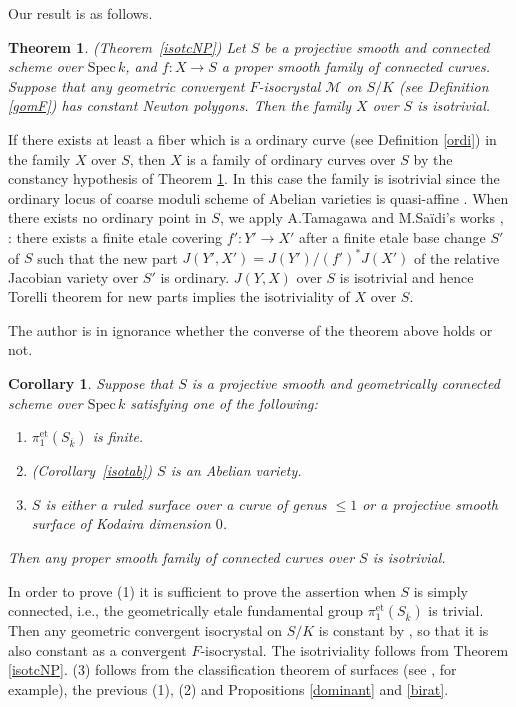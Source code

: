 \documentclass[11pt]{amsart}
\newtheorem{theorem}[Lemma]{Theorem}
\newtheorem{corollary}[Lemma]{Corollary}
\begin{document}
Our result is as follows. 

\begin{theorem}\label{isotcNP0} \mbox{\rm (Theorem \ref{isotcNP})} 
Let $S$ be a projective smooth and connected scheme over $\mathrm{Spec}\, k$, 
and $f : X \rightarrow S$ a proper smooth family of connected curves. 
Suppose that any geometric convergent $F$-isocrystal $\mathcal M$ on $S/K$ (see Definition \ref{gomF}) 
has constant Newton polygons. 
Then the family $X$ over $S$ is isotrivial. 
\end{theorem}

If there exists at least a fiber which is a ordinary curve (see Definition \ref{ordi}) in the family $X$ over $S$, 
then $X$ is a family of ordinary curves over $S$ by 
the constancy hypothesis of Theorem \ref{isotcNP0}. 
In this case the family is isotrivial since the ordinary locus of coarse moduli scheme of Abelian varieties 
is quasi-affine \cite[XI, Th\'eor\`eme 5.2]{MB}. 
When there exists no ordinary point in $S$, we apply A.Tamagawa and M.Sa\"idi's works \cite{tam}, \cite{saidi} : 
there exists a finite etale covering $f' : Y' \rightarrow X'$ after a finite etale base change $S'$ of $S$ 
such that the new part $J(Y', X') = J(Y')/(f')^\ast J(X')$ of 
the relative Jacobian variety over $S'$ is ordinary. 
$J(Y, X)$ over $S$ is isotrivial and hence Torelli theorem for new parts \cite[Corollaries 4.7]{tam} 
implies the isotriviality of $X$ over $S$. 

The author is in ignorance whether the converse of the theorem above holds or not. 

\begin{corollary}\label{isotrivial} Suppose that $S$  is a projective smooth and geometrically 
connected scheme over $\mathrm{Spec}\, k$ 
satisfying one of the following:
\begin{enumerate}
\item $\pi_1^{\mathrm{et}}(S_{\overline{k}}) $ is finite. 
\item \mbox{\rm (Corollary \ref{isotab})} $S$ is an Abelian variety. 
\item $S$ is either a ruled surface over a curve of genus $\leq 1$ 
or a projective smooth surface of Kodaira dimension $0$. 
\end{enumerate}

Then any proper smooth family of connected curves over $S$ is isotrivial. 
\end{corollary}

In order to prove (1) it is sufficient to prove the assertion when $S$ is simply connected, i.e., 
the geometrically etale fundamental group $\pi_1^{\mathrm{et}}(S_{\overline{k}})$ is trivial. 
Then any geometric convergent isocrystal on $S/K$ is constant by \cite[Theorem 1.3]{ES2}, 
so that it is also constant as a convergent $F$-isocrystal. 
The isotriviality follows from Theorem \ref{isotcNP}. 
(3) follows from the classification theorem of surfaces (see \cite{Li}, for example), 
the previous (1), (2) and Propositions \ref{dominant} and \ref{birat}. 
\end{document}
